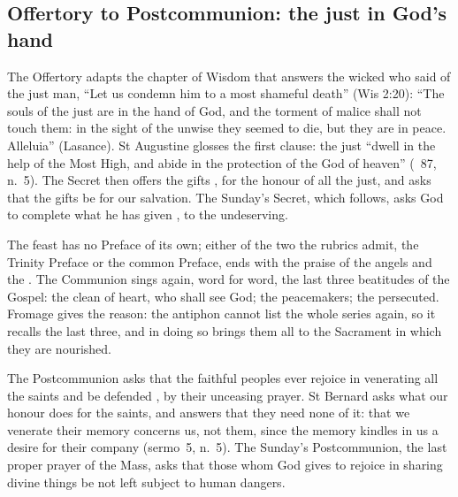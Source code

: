 \subsection{Offertory to Postcommunion: the just in God's hand}

The Offertory adapts the chapter of Wisdom that answers the wicked who said of
the just man, ``Let us condemn him to a most shameful death''
(Wis 2:20): ``The souls of
the just are in the hand of God, and the torment of malice shall not touch
them: in the sight of the unwise they seemed to die, but they are in peace.
Alleluia'' (Lasance). St Augustine glosses the first clause: the just ``dwell
in the help of the Most High, and abide in the protection of the God of
heaven'' (\ 87, n.~5). The Secret then offers the gifts , for the honour of all the just, and asks that the gifts be for our salvation. The Sunday's
Secret, which follows, asks God to complete what he has given
, to the undeserving.

The feast has no Preface of its own; either of the two the rubrics admit, the
Trinity Preface or the common Preface, ends with the praise of the angels and
the \latin{Sanctus}. The Communion sings again, word
for word, the last three beatitudes of the Gospel: the clean of heart, who
shall see God; the peacemakers; the persecuted. Fromage gives the reason: the
antiphon cannot list the whole series again, so it recalls the last three, and
in doing so brings them all to the Sacrament in which they are nourished.

The Postcommunion asks that the faithful peoples ever rejoice in venerating
all the saints and be defended \latin{perpetua supplicatione}, by their
unceasing prayer. St Bernard asks what our honour does for the saints, and
answers that they need none of it: that we venerate their memory concerns us,
not them, since the memory kindles in us a desire for their company
(sermo~5, n.~5). The Sunday's
Postcommunion, the last proper prayer of the Mass, asks that those whom God
gives to rejoice in sharing divine things be not left subject to human
dangers.
